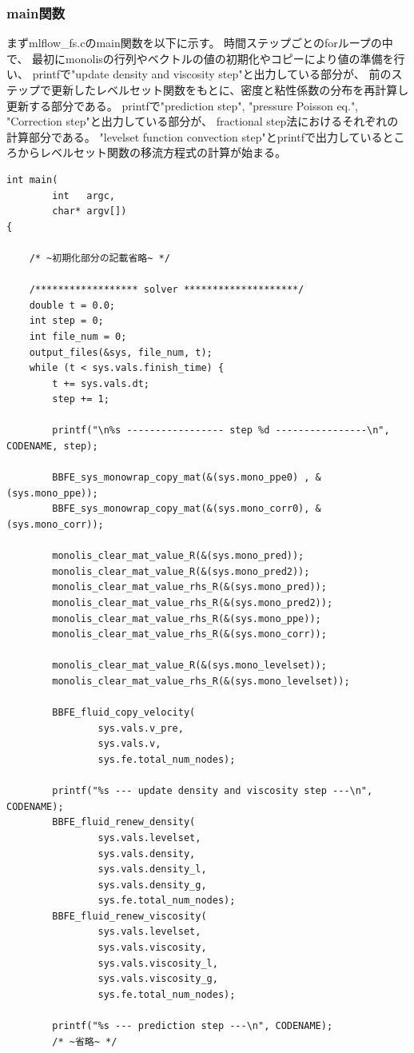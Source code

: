 \documentclass[8pt,a4paper]{article}
\begin{document}
\subsubsection{main関数}
まずmlflow\_fs.cのmain関数を以下に示す。
時間ステップごとのforループの中で、
最初にmonolisの行列やベクトルの値の初期化やコピーにより値の準備を行い、
printfで"update density and viscosity step"と出力している部分が、
前のステップで更新したレベルセット関数をもとに、密度と粘性係数の分布を再計算し更新する部分である。
printfで"prediction step", "pressure Poisson eq.", "Correction step"と出力している部分が、
fractional step法におけるそれぞれの計算部分である。
"levelset function convection step"とprintfで出力しているところからレベルセット関数の移流方程式の計算が始まる。
\begin{lstlisting}[caption = mlflow\_fs.cのmain関数のレベルセット関数の計算部分抜粋]
int main(
		int   argc,
		char* argv[])
{
　
	/* ~初期化部分の記載省略~ */

	/****************** solver ********************/
	double t = 0.0;
	int step = 0;
	int file_num = 0;
	output_files(&sys, file_num, t);
	while (t < sys.vals.finish_time) {
		t += sys.vals.dt;
		step += 1;

		printf("\n%s ----------------- step %d ----------------\n", CODENAME, step);

		BBFE_sys_monowrap_copy_mat(&(sys.mono_ppe0) , &(sys.mono_ppe));
		BBFE_sys_monowrap_copy_mat(&(sys.mono_corr0), &(sys.mono_corr));

		monolis_clear_mat_value_R(&(sys.mono_pred));
		monolis_clear_mat_value_R(&(sys.mono_pred2));
		monolis_clear_mat_value_rhs_R(&(sys.mono_pred));
		monolis_clear_mat_value_rhs_R(&(sys.mono_pred2));
		monolis_clear_mat_value_rhs_R(&(sys.mono_ppe));
		monolis_clear_mat_value_rhs_R(&(sys.mono_corr));
		
		monolis_clear_mat_value_R(&(sys.mono_levelset));
		monolis_clear_mat_value_rhs_R(&(sys.mono_levelset));

		BBFE_fluid_copy_velocity(
				sys.vals.v_pre, 
				sys.vals.v,
				sys.fe.total_num_nodes);

		printf("%s --- update density and viscosity step ---\n", CODENAME);
		BBFE_fluid_renew_density(
				sys.vals.levelset, 
				sys.vals.density,
				sys.vals.density_l,
				sys.vals.density_g,
				sys.fe.total_num_nodes);
		BBFE_fluid_renew_viscosity(
				sys.vals.levelset, 
				sys.vals.viscosity,
				sys.vals.viscosity_l,
				sys.vals.viscosity_g,
				sys.fe.total_num_nodes);

		printf("%s --- prediction step ---\n", CODENAME);
		/* ~省略~ */


\end{lstlisting}
\end{document}
